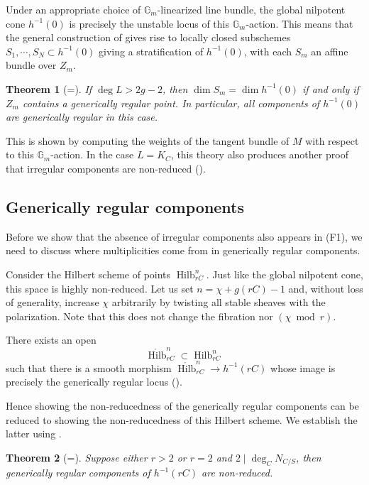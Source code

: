 \documentclass{amsart}
\theoremstyle{plain}
\newtheorem{theorem}{Theorem}[section]
\theoremstyle{definition}
\theoremstyle{remark}
\begin{document}
Under an appropriate choice of $\mathbb G_m$-linearized line bundle, the global nilpotent cone $h^{-1}(0)$ is precisely the unstable locus of this $\mathbb G_m$-action.
This means that the general construction of \cite{HL1} gives rise to locally closed subschemes $S_1,\cdots,S_N\subset h^{-1}(0)$ giving a stratification of $h^{-1}(0)$, with each $S_m$ an affine bundle over $Z_m$.

\begin{theorem}[=]\label{intro:Ltwisted_greg}
    If $\deg L>2g-2$, then $\dim S_m=\dim h^{-1}(0)$ if and only if $Z_m$ contains a generically regular point.
    In particular, all components of $h^{-1}(0)$ are generically regular in this case.
\end{theorem}

This is shown by computing the weights of the tangent bundle of $M$ with respect to this $\mathbb G_m$-action.
In the case $L=K_C$, this theory also produces another proof that irregular components are non-reduced ().

\subsection{Generically regular components}
Before we show that the absence of irregular components also appears in (F1), we need to discuss where multiplicities come from in generically regular components.

Consider the Hilbert scheme of points $\operatorname{Hilb}_{rC}^n$.
Just like the global nilpotent cone, this space is highly non-reduced.
Let us set $n=\chi+g(rC)-1$ and, without loss of generality, increase $\chi$ arbitrarily by twisting all stable sheaves with the polarization.
Note that this does not change the fibration nor $(\chi\bmod r)$.

There exists an open
\[\mathring{\operatorname{Hilb}}_{rC}^n\subset\operatorname{Hilb}_{rC}^n\]
such that there is a smooth morphism $\mathring{\operatorname{Hilb}}_{rC}^n\to h^{-1}(rC)$ whose image is precisely the generically regular locus ().

Hence showing the non-reducedness of the generically regular components can be reduced to showing the non-reducedness of this Hilbert scheme.
We establish the latter using \cite{luan}.
\begin{theorem}[=]\label{intro:gregnonred}
    Suppose either $r>2$ or $r=2$ and $2\mid \deg_CN_{C/S}$, then generically regular components of $h^{-1}(rC)$ are non-reduced.
\end{theorem}
\end{document}
